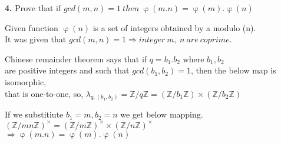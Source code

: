 \documentclass [12pt]{article}
\theoremstyle{definition}
\begin{document}
\newpage

{\bf 4.} Prove that if $gcd(m,n) = 1 \ then \ \upvarphi (m.n) = \upvarphi(m) . \upvarphi (n)$

\phantom{1em} Given function $ \upvarphi (n) $ is a set of integers obtained by a modulo (n).\\ 
\phantom{1em} It was given that $gcd(m,n) = 1 \Longrightarrow integer \ m, \ n \ are \ coprime$. 

\phantom{1em} Chinese remainder theorem says that if $q = b_{1}.b_{2}$ where  $b_{1} , b_{2}$ \\
\phantom{1em} are positive integers and such that $gcd(b_{1} , b_{2}) = 1$, then the below map is isomorphic,\\
\phantom{1em} that is one-to-one, so, $ \lambda _{q,(b_{1} , b_{2})} = \mathds {Z} /q\mathds {Z} = (\mathds {Z}/b_{1} \mathds {Z}) \times (\mathds {Z}/b_{2} \mathds {Z})$

\phantom{1em} If we substitiute $b_{1} = m, b_{2} = n$ we get below mapping.\\
\phantom{1em} $(\mathds {Z} /mn\mathds {Z})^{\times} = (\mathds {Z}/m \mathds {Z})^{\times} \times (\mathds {Z}/n \mathds {Z})^{\times}$\\
\phantom{1em} $\Longrightarrow  \upvarphi (m.n) = \upvarphi(m) . \upvarphi (n)$ 
\end{document}
